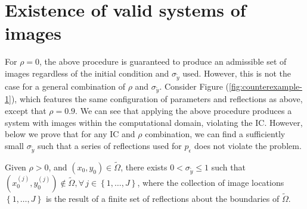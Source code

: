 \section{Existence of valid systems of images} \label{sec:proof} For
$\rho=0$, the above procedure is guaranteed to produce an admissible
set of images regardless of the initial condition and
$\sigma_{\tilde{y}}$ used. However, this is not the case for a general
combination of $\rho$ and $\sigma_{\tilde{y}}$. Consider Figure
(\ref{fig:counterexample-1}), which features the same configuration of
parameters and reflections as above, except that $\rho=0.9$. We can
see that applying the above procedure produces a system with images
within the computational domain, violating the IC.  However, below we
prove that for any IC and $\rho$ combination, we can find a
sufficiently small $\sigma_{\tilde{y}}$ such that a series of
reflections used for $p_\epsilon$ does not violate the problem.
\begin{lemma}
  Given $\rho > 0$, and $(x_0, y_0) \in \tilde{\Omega}$, there exists
  $0 < \sigma_{\tilde{y}} \leq 1$ such that
  $(x_0^{(j)}, y_0^{(j)}) \notin \tilde{\Omega}, \forall \, j\in
  \left\{1, \ldots, J\right\}$, where the collection of image
  locations $\left\{1, \ldots, J\right\}$ is the result of a finite
  set of reflections about the boundaries of $\tilde{\Omega}$.
\end{lemma}

